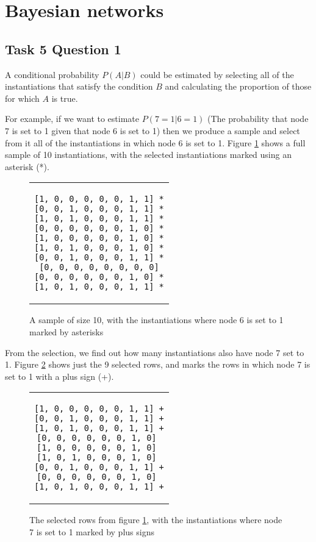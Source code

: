 \documentclass[a4paper,11pt]{article}
\begin{document}
\section{Bayesian networks}

\subsection{Task 5 Question 1}

A conditional probability $P(A|B)$ could be estimated by selecting all of the instantiations that satisfy the condition $B$ and calculating the proportion of those for which $A$ is true.

For example, if we want to estimate $P(7=1|6=1)$ (The probability that node 7 is set to 1 given that node 6 is set to 1) then we produce a sample and select from it all of the instantiations in which node 6 is set to 1.  Figure \ref{sample1} shows a full sample of 10 instantiations, with the selected instantiations marked using an asterisk (*).

\begin{figure}[h]
	\centering
	\lstset{basicstyle=\ttfamily}
	\begin{tabular}{c}
	\begin{lstlisting}
[1, 0, 0, 0, 0, 0, 1, 1] *
[0, 0, 1, 0, 0, 0, 1, 1] *
[1, 0, 1, 0, 0, 0, 1, 1] *
[0, 0, 0, 0, 0, 0, 1, 0] *
[1, 0, 0, 0, 0, 0, 1, 0] *
[1, 0, 1, 0, 0, 0, 1, 0] *
[0, 0, 1, 0, 0, 0, 1, 1] *
[0, 0, 0, 0, 0, 0, 0, 0]
[0, 0, 0, 0, 0, 0, 1, 0] *
[1, 0, 1, 0, 0, 0, 1, 1] *
	\end{lstlisting}
	\end{tabular}
	\caption{A sample of size 10, with the instantiations where node 6 is set to 1 marked by asterisks}
	\label{sample1}
\end{figure}

From the selection, we find out how many instantiations also have node 7 set to 1. Figure \ref{sample2} shows just the 9 selected rows, and marks the rows in which node 7 is set to 1 with a plus sign (+).

\begin{figure}[h]
	\centering
	\lstset{basicstyle=\ttfamily}
	\begin{tabular}{c}
	\begin{lstlisting}
[1, 0, 0, 0, 0, 0, 1, 1] +
[0, 0, 1, 0, 0, 0, 1, 1] +
[1, 0, 1, 0, 0, 0, 1, 1] +
[0, 0, 0, 0, 0, 0, 1, 0] 
[1, 0, 0, 0, 0, 0, 1, 0] 
[1, 0, 1, 0, 0, 0, 1, 0] 
[0, 0, 1, 0, 0, 0, 1, 1] +
[0, 0, 0, 0, 0, 0, 1, 0] 
[1, 0, 1, 0, 0, 0, 1, 1] +
	\end{lstlisting}
	\end{tabular}
	\caption{The selected rows from figure \ref{sample1}, with the instantiations where node 7 is set to 1 marked by plus signs}
	\label{sample2}
\end{figure}
\end{document}
